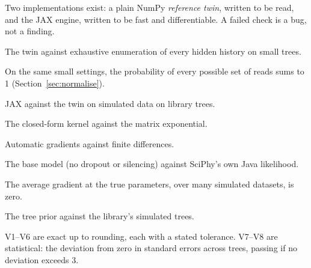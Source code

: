 \documentclass[11pt]{article}
\begin{document}
Two implementations exist: a plain NumPy \emph{reference twin}, written to be read, and the JAX engine,
written to be fast and differentiable. A failed check is a bug, not a finding.
\begin{description}\itemsep2pt
\item[V1] The twin against exhaustive enumeration of every hidden history on small trees.
\item[V2] On the same small settings, the probability of every possible set of reads sums to 1
  (Section~\ref{sec:normalise}).
\item[V3] JAX against the twin on simulated data on library trees.
\item[V4] The closed-form kernel against the matrix exponential.
\item[V5] Automatic gradients against finite differences.
\item[V6] The base model (no dropout or silencing) against SciPhy's own Java likelihood.
\item[V7] The average gradient at the true parameters, over many simulated datasets, is zero.
\item[V8] The tree prior against the library's simulated trees.
\end{description}
V1--V6 are exact up to rounding, each with a stated tolerance. V7--V8 are statistical: the deviation
from zero in standard errors across trees, passing if no deviation exceeds 3.
\end{document}
